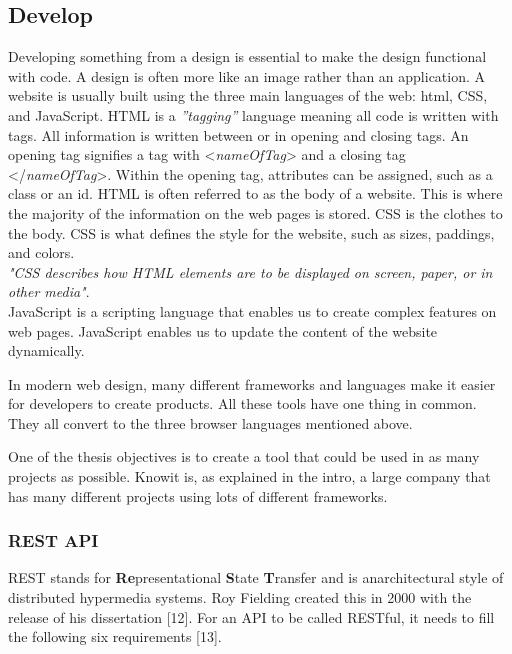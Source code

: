 \subsection{Develop}%
\label{sub:Develop}

Developing something from a design is essential to make the design functional with code. A design is often more like an image rather than an application. A website is usually built using the three main languages of the web: \acrfull{html}, CSS, and JavaScript. HTML is a \textit{''tagging''} language meaning all code is written with tags. All information is written between or in opening and closing tags. An opening tag signifies a tag with  <\textit{nameOfTag}> and a closing tag </\textit{nameOfTag}>. Within the opening tag, attributes can be assigned, such as a class or an id. 
HTML is often referred to as the body of a website. This is where the majority of the information on the web pages is stored. CSS is the clothes to the body. CSS is what defines the style for the website, such as sizes, paddings, and colors.\\
\textit{"CSS describes how HTML elements are to be displayed on screen, paper, or in other media"}\cite{CSSIntroduction}.\\
JavaScript is a scripting language that enables us to create complex features on web pages. JavaScript enables us to update the content of the website dynamically. 

In modern web design, many different frameworks and languages make it easier for developers to create products.  All these tools have one thing in common. They all convert to the three browser languages mentioned above. 

One of the thesis objectives is to create a tool that could be used in as many projects as possible. Knowit is, as explained in the intro, a large company that has many different projects using lots of different frameworks. 


\subsubsection{REST API}%
\label{sub:REST API}
REST stands for \textbf{Re}presentational \textbf{S}tate \textbf{T}ransfer and is anarchitectural style of distributed hypermedia systems. Roy Fielding created this in 2000 with the release of his dissertation [12]. For an API to be called RESTful, it needs to fill the following six requirements [13]. 

